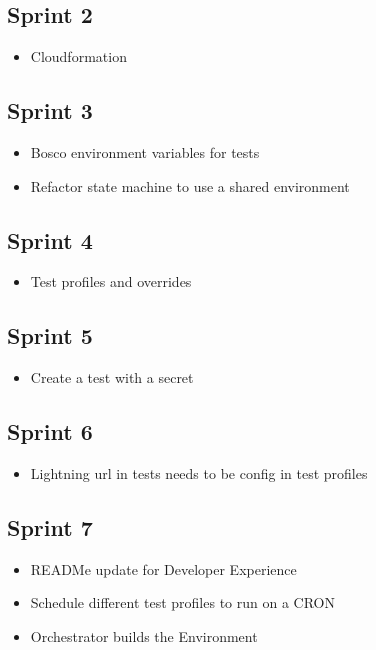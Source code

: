 \documentclass[12pt,a4paper,titlepage]{report}
\begin{document}
\subsection*{Sprint 2}
\begin{itemize}
\item Cloudformation
\end{itemize}

\subsection*{Sprint 3}
\begin{itemize}
\item Bosco environment variables for tests
\item Refactor state machine to use a shared environment
\end{itemize}

\subsection*{Sprint 4}
\begin{itemize}
\item Test profiles and overrides
\end{itemize}

\subsection*{Sprint 5}
\begin{itemize}
\item Create a test with a secret
\end{itemize}

\subsection*{Sprint 6}
\begin{itemize}
\item Lightning url in tests needs to be config in test profiles
\end{itemize}

\subsection*{Sprint 7}
\begin{itemize}
\item READMe update for Developer Experience
\item Schedule different test profiles to run on a CRON
\item Orchestrator builds the Environment
\end{itemize}
\end{document}
